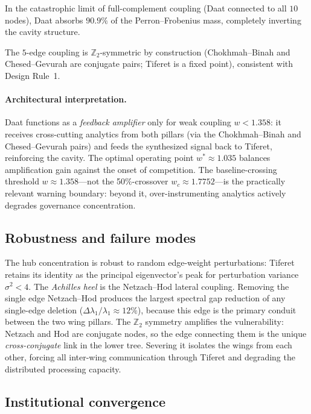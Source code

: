\documentclass[11pt,a4paper]{amsart}
\theoremstyle{remark}
\newcommand{\bbZ}{\mathbb{Z}}
\begin{document}
In the catastrophic limit of full-complement coupling (Daat connected to
all $10$ nodes), Daat absorbs $90.9\%$ of the Perron--Frobenius mass,
completely inverting the cavity structure.

The $5$-edge coupling is $\bbZ_2$-symmetric by construction
(Chokhmah--Binah and Chesed--Gevurah are conjugate pairs; Tiferet is a
fixed point), consistent with Design Rule~1.

\paragraph{Architectural interpretation.}
Daat functions as a \emph{feedback amplifier} only for weak coupling
$w < 1.358$: it receives cross-cutting analytics from both pillars (via the
Chokhmah--Binah and Chesed--Gevurah pairs) and feeds the synthesized
signal back to Tiferet, reinforcing the cavity. The optimal operating point
$w^* \approx 1.035$ balances amplification gain against the onset of
competition. The baseline-crossing threshold $w \approx 1.358$---not the
50\%-crossover $w_c \approx 1.7752$---is the practically relevant warning
boundary: beyond it, over-instrumenting analytics actively degrades
governance concentration.

\subsection{Robustness and failure modes}
\label{sec:robustness}

The hub concentration is robust to random edge-weight perturbations:
Tiferet retains its identity as the principal eigenvector's peak for
perturbation variance $\sigma^2 < 4$. The \emph{Achilles heel} is the
Netzach--Hod lateral coupling. Removing the single edge Netzach--Hod
produces the largest spectral gap reduction of any single-edge deletion
($\Delta \lambda_1 / \lambda_1 \approx 12\%$), because this edge is the
primary conduit between the two wing pillars. The $\bbZ_2$ symmetry
amplifies the vulnerability: Netzach and Hod are conjugate nodes, so the
edge connecting them is the unique \emph{cross-conjugate} link in the
lower tree. Severing it isolates the wings from each other, forcing all
inter-wing communication through Tiferet and degrading the distributed
processing capacity.

\subsection{Institutional convergence}
\label{sec:institutional-convergence}
\end{document}
